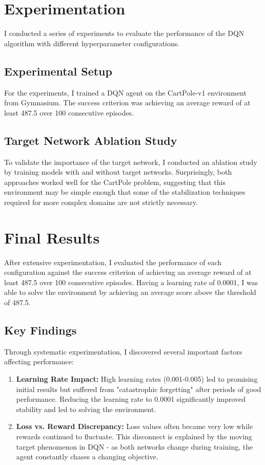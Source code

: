 \documentclass{article}
\begin{document}
\section{Experimentation}
I conducted a series of experiments to evaluate the performance of the DQN algorithm with different hyperparameter configurations.

\subsection{Experimental Setup}
For the experiments, I trained a DQN agent on the CartPole-v1 environment from Gymnasium. The success criterion was achieving an average reward of at least 487.5 over 100 consecutive episodes.

\subsection{Target Network Ablation Study}
To validate the importance of the target network, I conducted an ablation study by training models with and without target networks. Surprisingly, both approaches worked well for the CartPole problem, suggesting that this environment may be simple enough that some of the stabilization techniques required for more complex domains are not strictly necessary. 

\section{Final Results}
After extensive experimentation, I evaluated the performance of each configuration against the success criterion of achieving an average reward of at least 487.5 over 100 consecutive episodes. Having a learning rate of 0.0001, I was able to solve the environment by achieving an average score above the threshold of 487.5.

\subsection{Key Findings}
Through systematic experimentation, I discovered several important factors affecting performance:

\begin{enumerate}
    \item \textbf{Learning Rate Impact:} High learning rates (0.001-0.005) led to promising initial results but suffered from "catastrophic forgetting" after periods of good performance. Reducing the learning rate to 0.0001 significantly improved stability and led to solving the environment.
    
    \item \textbf{Loss vs. Reward Discrepancy:} Loss values often became very low while rewards continued to fluctuate. This disconnect is explained by the moving target phenomenon in DQN - as both networks change during training, the agent constantly chases a changing objective.
\end{enumerate}
\end{document}
